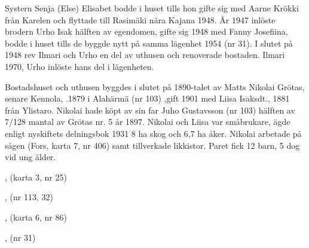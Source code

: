 Systern Senja (Else) Elisabet bodde i huset tills hon gifte sig med Aarne Krökki från Karelen och flyttade till Rasimäki nära Kajana 1948. År 1947 inlöste brodern Urho Isak hälften av egendomen, gifte sig 1948 med Fanny Josefiina, bodde i  huset tills de byggde nytt på samma lägenhet 1954 (nr 31). I slutet på 1948 rev Ilmari och Urho en del av uthusen och  renoverade bostaden.
Ilmari  1970, Urho inlöste hans del i lägenheten.


%
Bostadshuset och uthusen byggdes i slutet på 1890-talet av Matts Nikolai Grötas, senare Kennola, .1879 i Alahärmä (nr 103) ,gift 1901 med Liisa Isaksdt.,  1881 från Ylistaro. Nikolai hade köpt av sin far Juho Gustavsson (nr 103) hälften av 7/128 mantal av Grötas nr. 5 år 1897. Nikolai och Liisa var småbrukare, ägde enligt nyskiftets delningsbok 1931 8 ha skog och 6,7 ha åker. Nikolai arbetade på sågen (Fors, karta 7, nr 406) samt tillverkade likkistor. Paret fick 12 barn, 5 dog vid ung ålder.
\begin{jhchildren}
  \item {}
  \item {}
  \item {}
  \item {}
  \item {}, (karta 3, nr 25)
  \item {}, (nr 113, 32)
  \item {}
  \item {}, (karta 6, nr 86)
  \item {}
  \item {}
  \item {}, (nr 31)
  \item {}
\end{jhchildren}

